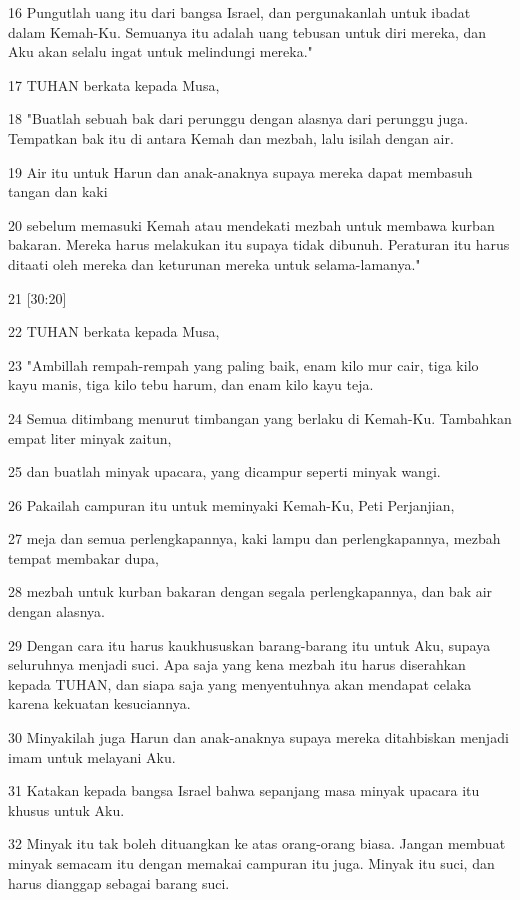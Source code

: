 \par 16 Pungutlah uang itu dari bangsa Israel, dan pergunakanlah untuk ibadat dalam Kemah-Ku. Semuanya itu adalah uang tebusan untuk diri mereka, dan Aku akan selalu ingat untuk melindungi mereka."
\par 17 TUHAN berkata kepada Musa,
\par 18 "Buatlah sebuah bak dari perunggu dengan alasnya dari perunggu juga. Tempatkan bak itu di antara Kemah dan mezbah, lalu isilah dengan air.
\par 19 Air itu untuk Harun dan anak-anaknya supaya mereka dapat membasuh tangan dan kaki
\par 20 sebelum memasuki Kemah atau mendekati mezbah untuk membawa kurban bakaran. Mereka harus melakukan itu supaya tidak dibunuh. Peraturan itu harus ditaati oleh mereka dan keturunan mereka untuk selama-lamanya."
\par 21 [30:20]
\par 22 TUHAN berkata kepada Musa,
\par 23 "Ambillah rempah-rempah yang paling baik, enam kilo mur cair, tiga kilo kayu manis, tiga kilo tebu harum, dan enam kilo kayu teja.
\par 24 Semua ditimbang menurut timbangan yang berlaku di Kemah-Ku. Tambahkan empat liter minyak zaitun,
\par 25 dan buatlah minyak upacara, yang dicampur seperti minyak wangi.
\par 26 Pakailah campuran itu untuk meminyaki Kemah-Ku, Peti Perjanjian,
\par 27 meja dan semua perlengkapannya, kaki lampu dan perlengkapannya, mezbah tempat membakar dupa,
\par 28 mezbah untuk kurban bakaran dengan segala perlengkapannya, dan bak air dengan alasnya.
\par 29 Dengan cara itu harus kaukhususkan barang-barang itu untuk Aku, supaya seluruhnya menjadi suci. Apa saja yang kena mezbah itu harus diserahkan kepada TUHAN, dan siapa saja yang menyentuhnya akan mendapat celaka karena kekuatan kesuciannya.
\par 30 Minyakilah juga Harun dan anak-anaknya supaya mereka ditahbiskan menjadi imam untuk melayani Aku.
\par 31 Katakan kepada bangsa Israel bahwa sepanjang masa minyak upacara itu khusus untuk Aku.
\par 32 Minyak itu tak boleh dituangkan ke atas orang-orang biasa. Jangan membuat minyak semacam itu dengan memakai campuran itu juga. Minyak itu suci, dan harus dianggap sebagai barang suci.

